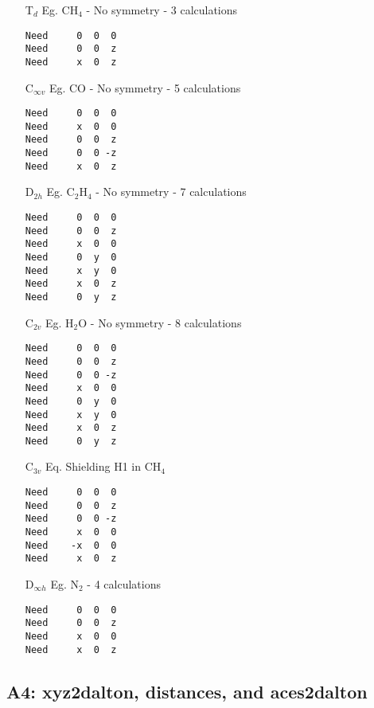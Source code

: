 \begin{itemize}
\item[T$_d$]   Eg. CH$_4$ - No symmetry - 3 calculations

\begin{verbatim}
Need     0  0  0
Need     0  0  z
Need     x  0  z
\end{verbatim}

\item[C$_{\infty v}$] Eg. CO - No symmetry - 5 calculations

\begin{verbatim}
Need     0  0  0
Need     x  0  0
Need     0  0  z
Need     0  0 -z
Need     x  0  z
\end{verbatim}

\item[D$_{2h}$] Eg. C$_2$H$_4$ -  No symmetry - 7 calculations

\begin{verbatim}
Need     0  0  0
Need     0  0  z
Need     x  0  0
Need     0  y  0
Need     x  y  0
Need     x  0  z
Need     0  y  z
\end{verbatim}

\item[C$_{2v}$] Eg. H$_2$O - No symmetry - 8 calculations

\begin{verbatim}
Need     0  0  0
Need     0  0  z
Need     0  0 -z
Need     x  0  0
Need     0  y  0
Need     x  y  0
Need     x  0  z
Need     0  y  z
\end{verbatim}

\item[C$_{3v}$] Eq. Shielding H1 in CH$_4$

\begin{verbatim}
Need     0  0  0
Need     0  0  z
Need     0  0 -z
Need     x  0  0
Need    -x  0  0
Need     x  0  z
\end{verbatim}

\item[D$_{\infty h}$] Eg. N$_2$ -  4 calculations

\begin{verbatim}
Need     0  0  0
Need     0  0  z
Need     x  0  0
Need     x  0  z
\end{verbatim}
\end{itemize}

\subsection*{A4: xyz2dalton, distances, and aces2dalton}

